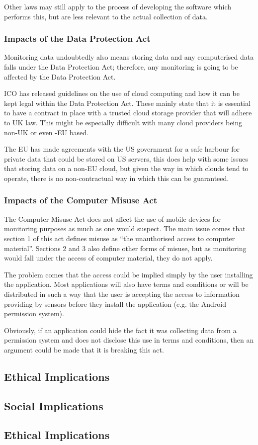 \documentclass[12pt, a4paper]{article}
\begin{document}
Other laws may still apply to the process of developing the software which
performs this, but are less relevant to the actual collection of data.


\subsubsection{Impacts of the Data Protection Act}
Monitoring data undoubtedly also means storing data and any computerised data
falls under the Data Protection Act; therefore, any monitoring is going to be
affected by the Data Protection Act.

\gls{ICO} has released guidelines\cite{ico2012cloud} on the use of cloud 
computing and how it can be kept legal within the Data Protection Act. These
mainly state that it is essential to have a contract in place with a trusted
cloud storage provider that will adhere to UK law. This might be especially
difficult with many cloud providers being non-UK or even -EU based.

The EU has made agreements with the US government for a safe harbour for
private data that could be stored on US servers\cite{eu2000safe}, this does
help with some issues that storing data on a non-EU cloud, but given the way in
which clouds tend to operate, there is no non-contractual way in which this can
be guaranteed.

\subsubsection{Impacts of the Computer Misuse Act}
The Computer Misuse Act does not affect the use of mobile devices for monitoring
purposes as much as one would suspect. The main issue comes that section 1 of
this act defines misuse as ``the unauthorised access to computer
material''\cite{cma1990}. Sections 2 and 3 also define other forms of misuse, 
but as monitoring would fall under the access of computer material, they do not
apply.

The problem comes that the access could be implied simply by the user installing
the application. Most applications will also have terms and conditions or will
be distributed in such a way that the user is accepting the access to
information providing by sensors before they install the application (e.g. the
Android permission system).

Obviously, if an application could hide the fact it was collecting data from a
permission system and does not disclose this use in terms and conditions, then
an argument could be made that it is breaking this act.


\subsection{Ethical Implications}

\subsection{Social Implications}

\subsection{Ethical Implications}


\newpage


\end{document}
